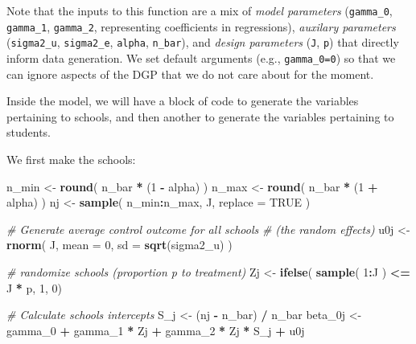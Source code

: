 \documentclass[
]{book}
\newenvironment{Shaded}{\begin{snugshade}}{\end{snugshade}}
\newcommand{\AttributeTok}[1]{\textcolor[rgb]{0.13,0.29,0.53}{#1}}
\newcommand{\CommentTok}[1]{\textcolor[rgb]{0.56,0.35,0.01}{\textit{#1}}}
\newcommand{\ConstantTok}[1]{\textcolor[rgb]{0.56,0.35,0.01}{#1}}
\newcommand{\DecValTok}[1]{\textcolor[rgb]{0.00,0.00,0.81}{#1}}
\newcommand{\FunctionTok}[1]{\textcolor[rgb]{0.13,0.29,0.53}{\textbf{#1}}}
\newcommand{\NormalTok}[1]{#1}
\newcommand{\OtherTok}[1]{\textcolor[rgb]{0.56,0.35,0.01}{#1}}
\newcommand{\SpecialCharTok}[1]{\textcolor[rgb]{0.81,0.36,0.00}{\textbf{#1}}}
\begin{document}
Note that the inputs to this function are a mix of \emph{model parameters} (\texttt{gamma\_0}, \texttt{gamma\_1}, \texttt{gamma\_2}, representing coefficients in regressions), \emph{auxilary parameters} (\texttt{sigma2\_u}, \texttt{sigma2\_e}, \texttt{alpha}, \texttt{n\_bar}), and \emph{design parameters} (\texttt{J}, \texttt{p}) that directly inform data generation.
We set default arguments (e.g., \texttt{gamma\_0=0}) so that we can ignore aspects of the DGP that we do not care about for the moment.

Inside the model, we will have a block of code to generate the variables pertaining to schools, and then another to generate the variables pertaining to students.

We first make the schools:

\begin{Shaded}
\begin{Highlighting}[]
\NormalTok{  n\_min }\OtherTok{\textless{}{-}} \FunctionTok{round}\NormalTok{( n\_bar }\SpecialCharTok{*}\NormalTok{ (}\DecValTok{1} \SpecialCharTok{{-}}\NormalTok{ alpha) )}
\NormalTok{  n\_max }\OtherTok{\textless{}{-}} \FunctionTok{round}\NormalTok{( n\_bar }\SpecialCharTok{*}\NormalTok{ (}\DecValTok{1} \SpecialCharTok{+}\NormalTok{ alpha) )}
\NormalTok{  nj }\OtherTok{\textless{}{-}} \FunctionTok{sample}\NormalTok{( n\_min}\SpecialCharTok{:}\NormalTok{n\_max, J, }\AttributeTok{replace =} \ConstantTok{TRUE}\NormalTok{ )}
  
  \CommentTok{\# Generate average control outcome for all schools}
  \CommentTok{\# (the random effects)}
\NormalTok{  u0j }\OtherTok{\textless{}{-}} \FunctionTok{rnorm}\NormalTok{( J, }\AttributeTok{mean =} \DecValTok{0}\NormalTok{, }\AttributeTok{sd =} \FunctionTok{sqrt}\NormalTok{(sigma2\_u) )}
  
  \CommentTok{\# randomize schools (proportion p to treatment)}
\NormalTok{  Zj }\OtherTok{\textless{}{-}} \FunctionTok{ifelse}\NormalTok{( }\FunctionTok{sample}\NormalTok{( }\DecValTok{1}\SpecialCharTok{:}\NormalTok{J ) }\SpecialCharTok{\textless{}=}\NormalTok{ J }\SpecialCharTok{*}\NormalTok{ p, }\DecValTok{1}\NormalTok{, }\DecValTok{0}\NormalTok{)}
  
  \CommentTok{\# Calculate schools intercepts}
\NormalTok{  S\_j }\OtherTok{\textless{}{-}}\NormalTok{ (nj }\SpecialCharTok{{-}}\NormalTok{ n\_bar) }\SpecialCharTok{/}\NormalTok{ n\_bar}
\NormalTok{  beta\_0j }\OtherTok{\textless{}{-}}\NormalTok{ gamma\_0 }\SpecialCharTok{+}\NormalTok{ gamma\_1 }\SpecialCharTok{*}\NormalTok{ Zj }\SpecialCharTok{+}\NormalTok{ gamma\_2 }\SpecialCharTok{*}\NormalTok{ Zj }\SpecialCharTok{*}\NormalTok{ S\_j }\SpecialCharTok{+}\NormalTok{ u0j}
\end{Highlighting}
\end{Shaded}
\end{document}
